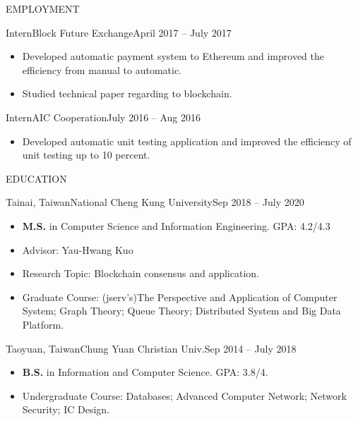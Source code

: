 \documentclass[]{mcdowellcv}
\begin{document}
	\makeheader
	
	\begin{cvsection}{EMPLOYMENT}
		\begin{cvsubsection}{Intern}{Block Future Exchange}{April 2017 -- July 2017}	
			\begin{itemize}
				\item Developed automatic payment system to Ethereum and improved the efficiency from manual to automatic.
				\item Studied technical paper regarding to blockchain.
			\end{itemize}
		\end{cvsubsection}
		\begin{cvsubsection}{Intern}{AIC Cooperation}{July 2016 -- Aug 2016}	
			\begin{itemize}
				\item Developed automatic unit testing application and improved the efficiency of unit testing up to 10 percent.
			\end{itemize}
		\end{cvsubsection}
	\end{cvsection}
	
	\begin{cvsection}{EDUCATION}
		\begin{cvsubsection}{Tainai, Taiwan}{National Cheng Kung University}{Sep 2018 -- July 2020}
			\begin{itemize}
				\item \textbf{M.S.} in Computer Science and Information Engineering. GPA: 4.2/4.3
				\item Advisor: Yau-Hwang Kuo
				\item Research Topic: Blockchain consensus and application.
				\item Graduate Course: (jserv's)The Perspective and Application of Computer System; Graph Theory; Queue Theory; Distributed System and Big Data Platform.
			\end{itemize}
		\end{cvsubsection}
		
		\begin{cvsubsection}{Taoyuan, Taiwan}{Chung Yuan Christian Univ.}{Sep 2014 -- July 2018}
			\begin{itemize}
				\item \textbf{B.S.} in Information and Computer Science.  GPA: 3.8/4.
                \item Undergraduate Course: Databases; Advanced Computer Network; Network Security; IC Design.
			\end{itemize}
		\end{cvsubsection}
	\end{cvsection}
	
\end{document}
